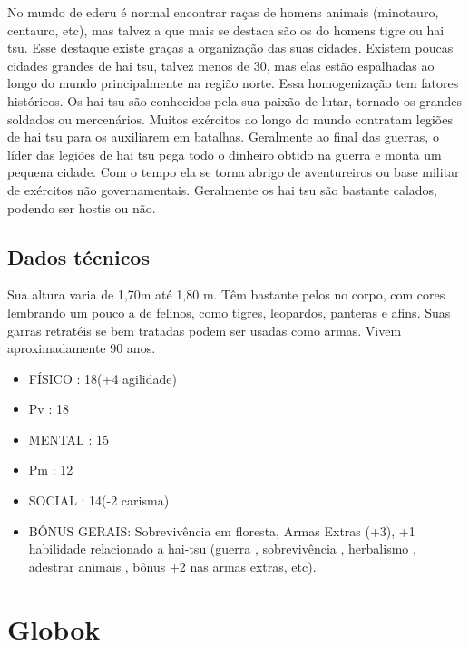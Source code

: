 No mundo de ederu é normal encontrar raças de homens animais (minotauro, centauro, etc), mas talvez a que mais se destaca são os do homens tigre ou hai tsu. Esse destaque existe graças a organização das suas cidades. Existem poucas cidades grandes de hai tsu, talvez menos de 30, mas elas estão espalhadas ao longo do mundo principalmente na região norte. Essa homogenização tem fatores históricos. Os hai tsu são conhecidos pela sua paixão de lutar, tornado-os grandes soldados ou mercenários. Muitos exércitos ao longo do mundo contratam legiões de hai tsu para os auxiliarem em batalhas. Geralmente ao final das guerras, o líder das legiões de hai tsu pega todo o dinheiro obtido na guerra e monta um pequena cidade. Com o tempo ela se torna abrigo de aventureiros ou base militar de exércitos não governamentais. Geralmente os hai tsu são bastante calados, podendo ser hostis ou não. 

\subsection{Dados técnicos}


Sua altura varia de 1,70m até 1,80 m. Têm bastante pelos no corpo, com cores lembrando um pouco a de felinos, como tigres, leopardos, panteras e afins. Suas garras retratéis se bem tratadas podem ser usadas como armas. Vivem aproximadamente 90 anos. 


\begin{itemize}


\item FÍSICO : 18(+4 agilidade)
\item Pv : 18 

\item MENTAL : 15
\item Pm : 12

\item SOCIAL : 14(-2 carisma)

\item BÔNUS GERAIS: Sobrevivência em floresta, Armas Extras (+3), +1 habilidade relacionado a hai-tsu (guerra , sobrevivência , herbalismo , adestrar animais , bônus +2 nas armas extras, etc). 


\end{itemize}



\section{Globok}

